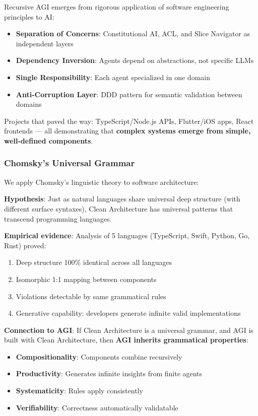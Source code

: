 \documentclass[11pt]{article}
\begin{document}
Recursive AGI emerges from rigorous application of software engineering principles to AI:

\begin{itemize}
    \item \textbf{Separation of Concerns}: Constitutional AI, ACL, and Slice Navigator as independent layers
    \item \textbf{Dependency Inversion}: Agents depend on abstractions, not specific LLMs
    \item \textbf{Single Responsibility}: Each agent specialized in one domain
    \item \textbf{Anti-Corruption Layer}: DDD pattern for semantic validation between domains
\end{itemize}

Projects that paved the way: TypeScript/Node.js APIs, Flutter/iOS apps, React frontends --- all demonstrating that \textbf{complex systems emerge from simple, well-defined components}.

\subsubsection{Chomsky's Universal Grammar}

We apply Chomsky's linguistic theory to software architecture:

\textbf{Hypothesis}: Just as natural languages share universal deep structure (with different surface syntaxes), Clean Architecture has universal patterns that transcend programming languages.

\textbf{Empirical evidence}: Analysis of 5 languages (TypeScript, Swift, Python, Go, Rust) proved:
\begin{enumerate}
    \item Deep structure 100\% identical across all languages
    \item Isomorphic 1:1 mapping between components
    \item Violations detectable by same grammatical rules
    \item Generative capability: developers generate infinite valid implementations
\end{enumerate}

\textbf{Connection to AGI}: If Clean Architecture is a universal grammar, and AGI is built with Clean Architecture, then \textbf{AGI inherits grammatical properties}:

\begin{itemize}
    \item \textbf{Compositionality}: Components combine recursively
    \item \textbf{Productivity}: Generates infinite insights from finite agents
    \item \textbf{Systematicity}: Rules apply consistently
    \item \textbf{Verifiability}: Correctness automatically validatable
\end{itemize}
\end{document}
